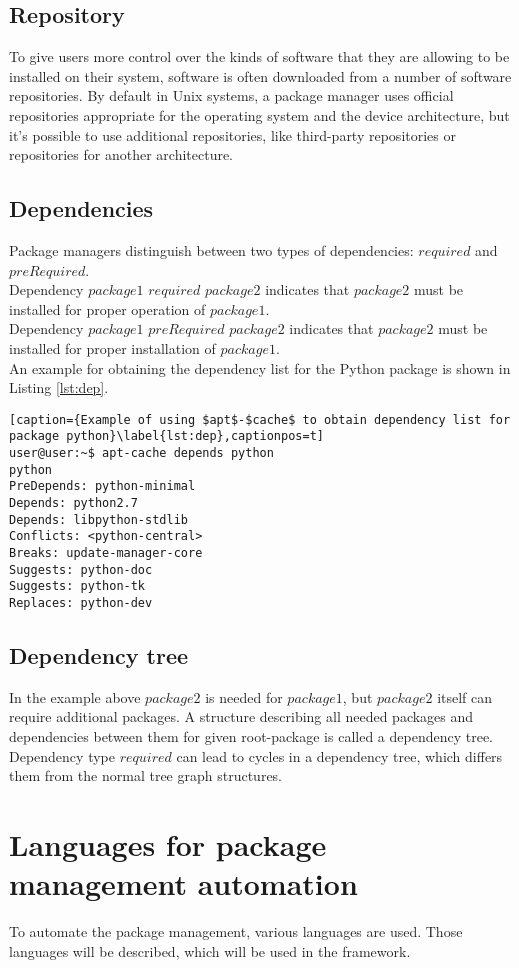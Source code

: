 \subsection*{Repository}
To give users more control over the kinds of software that they are allowing to be installed on their system, software is often downloaded from a number of software repositories.
By default in Unix systems, a package manager uses official repositories appropriate for the operating system and the device architecture, but it's possible to use additional repositories, like third-party repositories or repositories for another architecture.
\subsection*{Dependencies} \label{subs:dep}
Package managers distinguish between two types of dependencies: $required$ and $preRequired$.\\
Dependency $package1$ $required$ $package2$ indicates that $package2$ must be installed for proper operation of $package1$.\\
Dependency $package1$ $preRequired$ $package2$ indicates that $package2$ must be installed for proper installation of $package1$.\\
An example for obtaining the dependency list for the Python package is shown in Listing \ref{lst:dep}.
\begin{lstlisting}[caption={Example of using $apt$-$cache$ to obtain dependency list for package python}\label{lst:dep},captionpos=t] 
user@user:~$ apt-cache depends python
python
PreDepends: python-minimal
Depends: python2.7
Depends: libpython-stdlib
Conflicts: <python-central>
Breaks: update-manager-core
Suggests: python-doc
Suggests: python-tk
Replaces: python-dev
\end{lstlisting}
\subsection*{Dependency tree}
In the example above $package2$ is needed for $package1$, but $package2$ itself can require additional packages.
A structure describing all needed packages and dependencies between them for given root-package is called a dependency tree. 
Dependency type $required$ can lead to cycles in a dependency tree, which differs them from the normal tree graph structures.

\section{Languages for package management automation}
To automate the package management, various languages are used. 
Those languages will be described, which will be used in the framework.
